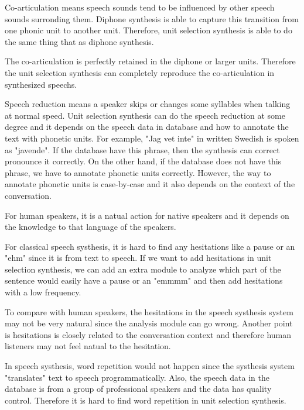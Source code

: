 \documentclass[12pt]{article}
\newenvironment{problem}[2][Problem]{\begin{trivlist}
\item[\hskip \labelsep {\bfseries #1}\hskip \labelsep {\bfseries #2.}]}{\end{trivlist}}
\begin{document}
\begin{problem}{2.2}

    Co-articulation means speech sounds tend to be influenced by other speech 
    sounds surronding them.
    Diphone synthesis is able to capture this transition from one phonic unit 
    to another unit.
    Therefore, unit selection synthesis is able to do the same thing that as 
    diphone synthesis.

    The co-articulation is perfectly retained in the diphone or larger 
    units. 
    Therefore the unit selection synthesis can completely reproduce 
    the co-articulation in synthesized speechs.
    

    Speech reduction means a speaker skips or changes some syllables when talking
    at normal speed. Unit selection synthesis can do the speech reduction at 
    some degree and it depends on the speech data in database and how to annotate 
    the text with phonetic units. 
    For example, "Jag vet inte" in written Swedish is spoken as "javende". If
    the database have this phrase, then the synthesis can correct pronounce it
    correctly. On the other hand, if the database does not have this phrase, 
    we have to annotate phonetic units correctly. However, the way to annotate
    phonetic units is case-by-case and it also depends on the context of the 
    conversation.

    For human speakers, it is a natual action for native speakers and it depends
    on the knowledge to that language of the speakers.

    For classical speech systhesis, it is hard to find any hesitations like 
    a pause or an "ehm" since it is from text to speech. 
    If we want to add hesitations in unit
    selection synthesis, we can add an extra module to analyze which part of the 
    sentence would easily have a pause or an "emmmm" and then add hesitations with
    a low frequency.

    To compare with human speakers, the hesitations in the speech systhesis system
    may not be very natural since the analysis module can go wrong. Another point
    is hesitations is closely related to the conversation context and therefore
    human listeners may not feel natual to the hesitation.

    In speech systhesis, word repetition would not happen since the systhesis
    system "translates" text to speech programmatically. Also, the speech data in
    the database is from a group of professional speakers and the data has quality control.
    Therefore it is hard to find word repetition in unit selection synthesis.


\end{problem}
\end{document}
